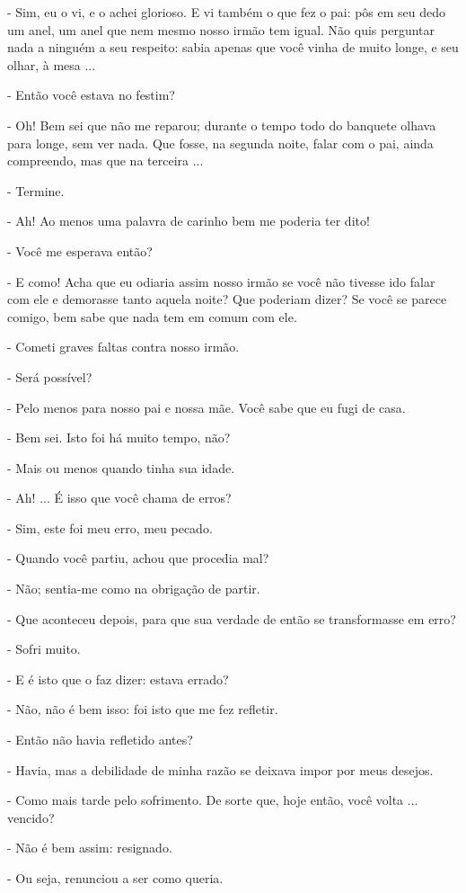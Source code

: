 - Sim, eu o vi, e o achei glorioso. E vi também o que fez o pai: pôs em
seu dedo um anel, um anel que nem mesmo nosso irmão tem igual. Não quis
perguntar nada a ninguém a seu respeito: sabia apenas que você vinha de
muito longe, e seu olhar, à mesa ...

- Então você estava no festim?

- Oh! Bem sei que não me reparou; durante o tempo todo do banquete
olhava para longe, sem ver nada. Que fosse, na segunda noite, falar com
o pai, ainda compreendo, mas que na terceira ...

- Termine.

- Ah! Ao menos uma palavra de carinho bem me poderia ter dito!

- Você me esperava então?

- E como! Acha que eu odiaria assim nosso irmão se você não tivesse ido
falar com ele e demorasse tanto aquela noite? Que poderiam dizer? Se
você se parece comigo, bem sabe que nada tem em comum com ele.

- Cometi graves faltas contra nosso irmão.

- Será possível?

- Pelo menos para nosso pai e nossa mãe. Você sabe que eu fugi de casa.

- Bem sei. Isto foi há muito tempo, não?

- Mais ou menos quando tinha sua idade.

- Ah! ... É isso que você chama de erros?

- Sim, este foi meu erro, meu pecado.

- Quando você partiu, achou que procedia mal?

- Não; sentia-me como na obrigação de partir.

- Que aconteceu depois, para que sua verdade de então se transformasse
em erro?

- Sofri muito.

- E é isto que o faz dizer: estava errado?

- Não, não é bem isso: foi isto que me fez refletir.

- Então não havia refletido antes?

- Havia, mas a debilidade de minha razão se deixava impor por meus
desejos.

- Como mais tarde pelo sofrimento. De sorte que, hoje então, você volta
... vencido?

- Não é bem assim: resignado.

- Ou seja, renunciou a ser como queria.

